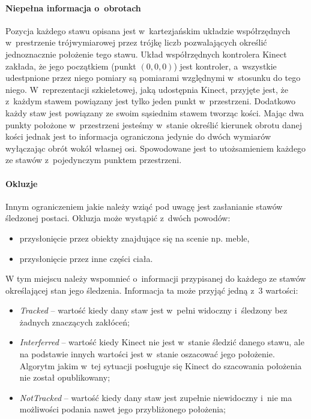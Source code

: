 \paragraph*{Niepełna informacja o~obrotach}
Pozycja każdego stawu opisana jest w~kartezjańskim układzie współrzędnych w~prestrzenie trójwymiarowej przez trójkę liczb pozwalających określić jednoznacznie położenie tego stawu. Układ współrzędnych kontrolera Kinect zakłada, że jego początkiem (punkt $(0, 0, 0)$) jest kontroler, a~wszystkie udestpnione przez niego pomiary są pomiarami względnymi w~stosunku do tego niego. W~reprezentacji szkieletowej, jaką udostępnia Kinect, przyjęte jest, że z~każdym stawem powiązany jest tylko jeden punkt w~przestrzeni. Dodatkowo każdy staw jest powiązany ze swoim sąsiednim stawem tworząc kości. Mając dwa punkty położone w~przestrzeni jesteśmy w~stanie określić kierunek obrotu danej kości jednak jest to informacja ograniczona jedynie do dwóch wymiarów wyłączając obrót wokół własnej osi. Spowodowane jest to utożsamieniem każdego ze stawów z~pojedynczym punktem przestrzeni.
		
\paragraph*{Okluzje}
Innym ograniczeniem jakie należy wziąć pod uwagę jest zasłanianie stawów śledzonej postaci. Okluzja może wystąpić z~dwóch powodów:
\begin{itemize}
	\item przysłonięcie przez obiekty znajdujące się na scenie np. meble,
	\item przysłonięcie przez inne części ciała.
\end{itemize}
		
W tym miejscu należy wspomnieć o~informacji przypisanej do każdego ze stawów określającej stan jego śledzenia. Informacja ta może przyjąć jedną z~3 wartości:
\begin{itemize}
	\item \emph{Tracked} -- wartość kiedy dany staw jest w~pełni widoczny i~śledzony bez żadnych znaczących zakłóceń;
	\item \emph{Interferred} -- wartość kiedy Kinect nie jest w~stanie śledzić danego stawu, ale na podstawie innych wartości jest w~stanie oszacować jego położenie. Algorytm jakim w~tej sytuacji posługuje się Kinect do szacowania położenia nie został opublikowany;
	\item \emph{NotTracked} -- wartość kiedy dany staw jest zupełnie niewidoczny i~nie ma możliwości podania nawet jego przybliżonego położenia;
\end{itemize}
		
